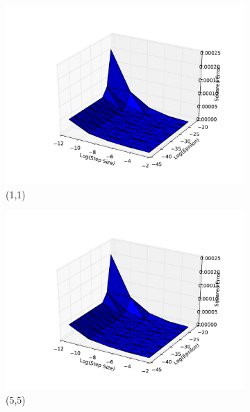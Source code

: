 \documentclass[psamsfonts]{amsart}
\theoremstyle{definition}
\theoremstyle{remark}
\numberwithin{equation}{section}
\begin{document}
\begin{figure}
	\centering
	\begin{subfigure}[b]{0.45\textwidth}
		\includegraphics[width=\textwidth]{hw1_1-2_0.pdf}
		\caption{(1,1)}
	\end{subfigure}
	\begin{subfigure}[b]{0.45\textwidth}
		\includegraphics[width=\textwidth]{hw1_1-2_1.pdf}
		\caption{(5,5)}
	\end{subfigure}
	\begin{subfigure}[b]{0.45\textwidth}

\end{subfigure}
\end{figure}
\end{document}
